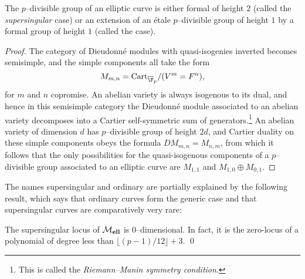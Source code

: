 \begin{lemma}
The $p$--divisible group of an elliptic curve is either formal of height $2$ (called the \textit{supersingular} case) or an extension of an \'etale $p$--divisible group of height $1$ by a formal group of height $1$ (called the  case).
\end{lemma}
\begin{proof}
The category of Dieudonn\'e modules with quasi-isogenies inverted becomes semisimple, and the simple components all take the form \[M_{m, n} = \Cart_{\overline{\F}_p} / (V^m = F^n),\] for $m$ and $n$ copromise.  An abelian variety is always isogenous to its dual, and hence in this semisimple category the Dieudonn\'e module associated to an abelian variety decomposes into a Cartier self-symmetric sum of generators.\footnote{This is called the \textit{Riemann--Manin symmetry condition}.}  An abelian variety of dimension $d$ has $p$--divisible group of height $2d$, and Cartier duality on these simple components obeys the formula $DM_{m,n} = M_{n,m}$, from which it follows that the only possibilities for the quasi-isogenous components of a $p$--divisible group associated to an elliptic curve are $M_{1,1}$ and $M_{1,0} \oplus M_{0,1}$.
\end{proof}

The names supersingular and ordinary are partially explained by the following result, which says that ordinary curves form the generic case and that supersingular curves are comparatively very rare:

\begin{lemma}
The supersingular locus of $\mathcal{M}_{\mathbf{ell}}$ is $0$--dimensional.  In fact, it is the zero-locus of a polynomial of degree less than $\lfloor (p-1)/12 \rfloor + 3$. \qed
\end{lemma}

